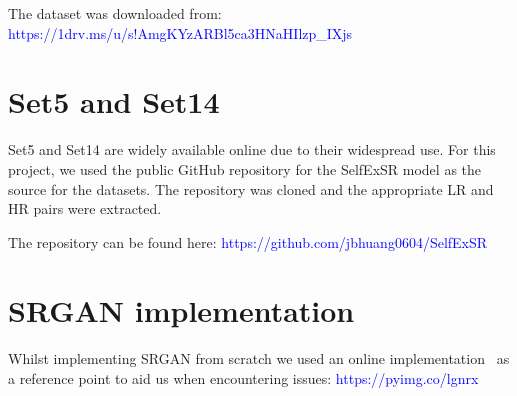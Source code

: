 \begin{appendices}
The dataset was downloaded from: \textcolor{blue}{https://1drv.ms/u/s!AmgKYzARBl5ca3HNaHIlzp\_IXjs}

\section{Set5 and Set14}
Set5 and Set14 are widely available online due to their widespread use. For this project, we used the public GitHub repository for the SelfExSR model as the source for the datasets. The repository was cloned and the appropriate LR and HR pairs were extracted.

The repository can be found here: \textcolor{blue}{https://github.com/jbhuang0604/SelfExSR}

\section{SRGAN implementation}
Whilst implementing SRGAN from scratch we used an online implementation~\cite{srganImplementation} as a reference point to aid us when encountering issues: \textcolor{blue}{https://pyimg.co/lgnrx}


\end{appendices}
